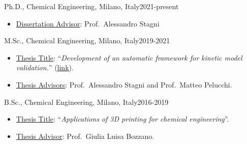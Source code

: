 \begin{position}{Ph.D., Chemical Engineering}{\polimi, Milano, Italy}{2021-present}
    \begin{itemize}
        \item[ ] \ul{Dissertation Advisor}: Prof.\ Alessandro Stagni
    \end{itemize}
\end{position}

\begin{position}{M.Sc., Chemical Engineering}{\polimi, Milano, Italy}{2019-2021}
    \begin{itemize}
        \item[ ] \ul{Thesis Title}: ``{\it Development of an automatic framework for kinetic
              model validation.}'' (\href{https://hdl.handle.net/10589/179004}{link}).
        \item[ ] \ul{Thesis Advisors}: Prof.\ Alessandro Stagni and Prof.\ Matteo Pelucchi.
    \end{itemize}
\end{position}

\begin{position}{B.Sc., Chemical Engineering}{\polimi, Milano, Italy}{2016-2019}
    \begin{itemize}
        \item[ ] \ul{Thesis Title}: ``{\it Applications of 3D printing for chemical engineering}''.
        \item[ ] \ul{Thesis Advisor}: Prof.\ Giulia Luisa Bozzano.
    \end{itemize}
\end{position}

